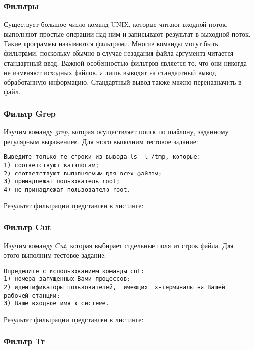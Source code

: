 \documentclass[14pt,a4paper,report]{report}
\begin{document}
\subsubsection{Фильтры}

Существует большое  число  команд  UNIX,  которые  читают входной поток,  выполняют  простые операции над ним и записывают результат в выходной поток.  Такие программы называются фильтрами. Многие команды могут быть фильтрами, поскольку обычно в случае незадания файла-аргумента читается стандартный ввод.  Важной особенностью фильтров  является то,  что они никогда не изменяют исходных файлов,  а лишь выводят на стандартный вывод обработанную информацию.  Стандартный  вывод  также можно переназначить в файл.

\subsubsection{Фильтр Grep}

Изучим команду \emph{grep}, которая осуществляет поиск по шаблону, заданному регулярным выражением. Для этого выполним тестовое задание:

\begin{verbatim}
Выведите только те строки из вывода ls -l /tmp, которые: 
1) соответствуют каталогам; 
2) соответствуют выполняемым для всех файлам; 
3) принадлежат пользователь root; 
4) не принадлежат пользователю root.
\end{verbatim}

Результат фильтрации представлен в листинге:



\subsubsection{Фильтр Cut}

Изучим команду \emph{Сut}, которая выбирает отдельные поля из строк файла. Для этого выполним тестовое задание:

\begin{verbatim}
Определите с использованием команды cut: 
1) номера запущенных Вами процессов; 
2) идентификаторы пользователей,  имеющих  x-терминалы на Вашей рабочей станции; 
3) Ваше входное имя в системе.
\end{verbatim}

Результат фильтрации представлен в листинге:



\subsubsection{Фильтр Tr}
\end{document}

